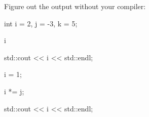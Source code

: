 Figure out the output without your compiler:

\begin{console}

int i = 2, j = -3, k = 5;



i %

std::cout << i << std::endl;



i = 1;

i *= j;

std::cout << i << std::endl;

\end{console}

